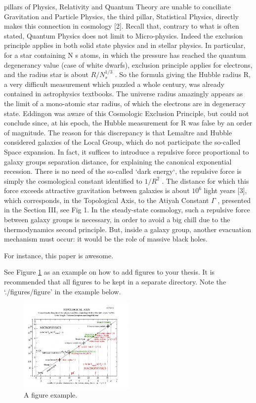 pillars of Physics, Relativity and Quantum Theory are unable to conciliate Gravitation and Particle
Physics, the third pillar, Statistical Physics, directly makes this connection in cosmology [2].
Recall that, contrary to what is often stated, Quantum Physics does not limit to Micro-physics.
Indeed the exclusion principle applies in both solid state physics and in stellar physics. In particular,
for a star containing N s atoms, in which the pressure has reached the quantum degenerancy value
(case of white dwarfs), exclusion principle applies for electrons, and the radius star is about $R/N_{s}^{1/3}$ .
So the formula giving the Hubble radius R, a very difficult measurement which puzzled a whole
century, was already contained in astrophysics textbooks. The universe radius amazingly appears as
the limit of a mono-atomic star radius, of which the electrons are in degeneracy state. Eddingon was
aware of this Cosmologic Exclusion Principle, but could not conclude since, at his epoch, the
Hubble measurement for R was false by an order of magnitude.
The reason for this discrepancy is that Lemaître and Hubble considered galaxies of the Local
Group, which do not participate the so-called Space expansion. In fact, it suffices to introduce a
repulsive force proportional to galaxy groups separation distance, for explaining the canonical
exponential recession. There is no need of the so-called `dark energy`, the repulsive force is simply
the cosmological constant identified to $1/R^{2}$ . The distance for which this force exceeds attractive
gravitation between galaxies is about $10^{6}$ light years [3], which corresponds, in the Topological
Axis, to the Atiyah Constant $\Gamma$ , presented in the Section III, see Fig 1.
In the steady-state cosmology, such a repulsive force between galaxy groups is necessary, in
order to avoid a big chill due to the thermodynamics second principle. But, inside a galaxy group,
another evacuation mechanism must occur: it would be the role of massive black holes.

For instance, this paper \cite{fm1} is awesome.

See Figure \ref{fig:figure_label} as an example on how to add figures to your thesis.
It is recommended that all figures to be kept in a separate directory.
Note the `./figures/figure' in the example below.


\begin{figure}
\centering
\includegraphics[width=0.5\textwidth]{./figures/figure}
\caption{A figure example.}
\label{fig:figure_label}
\end{figure}



